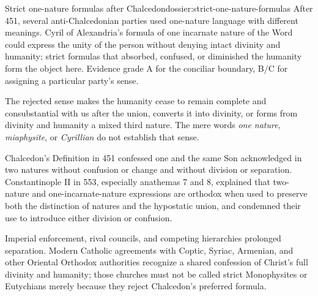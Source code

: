 \begin{heresydossier}{Strict one-nature formulas after Chalcedon}{dossier:strict-one-nature-formulas}
\objectfield After 451, several anti-Chalcedonian parties used one-nature language with different meanings. Cyril of Alexandria's formula of one incarnate nature of the Word could express the unity of the person without denying intact divinity and humanity; strict formulas that absorbed, confused, or diminished the humanity form the object here. Evidence grade A for the conciliar boundary, B/C for assigning a particular party's sense.

\propositionfield The rejected sense makes the humanity cease to remain complete and consubstantial with us after the union, converts it into divinity, or forms from divinity and humanity a mixed third nature. The mere words \emph{one nature}, \emph{miaphysite}, or \emph{Cyrillian} do not establish that sense.

\responsefield Chalcedon's Definition in 451 confessed one and the same Son acknowledged in two natures without confusion or change and without division or separation. Constantinople II in 553, especially anathemas 7 and 8, explained that two-nature and one-incarnate-nature expressions are orthodox when used to preserve both the distinction of natures and the hypostatic union, and condemned their use to introduce either division or confusion.

\aftermathfield Imperial enforcement, rival councils, and competing hierarchies prolonged separation. Modern Catholic agreements with Coptic, Syriac, Armenian, and other Oriental Orthodox authorities recognize a shared confession of Christ's full divinity and humanity; those churches must not be called strict Monophysites or Eutychians merely because they reject Chalcedon's preferred formula.
\end{heresydossier}

